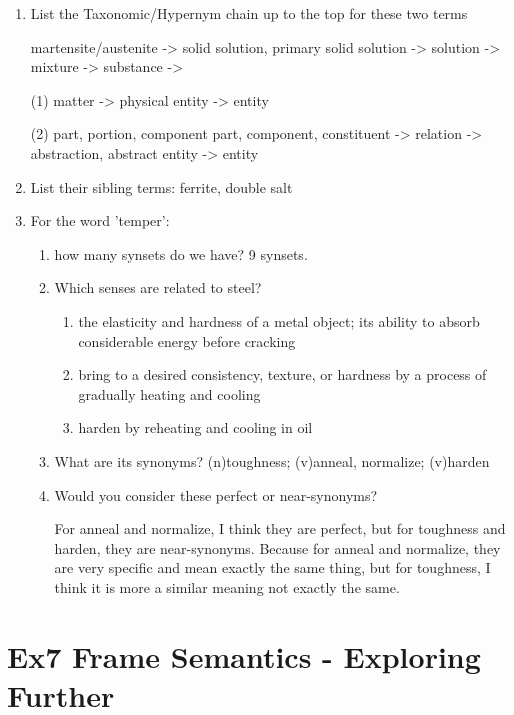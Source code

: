\documentclass[12pt]{article}
\begin{document}
{\begin{enumerate}[1.]
	martensite: a solid solution of carbon in alpha-iron that is formed when steel is cooled so rapidly that 
	the change from austenite to pearlite is suppressed; responsible for the hardness of quenched steel.

	austenite: a solid solution of ferric carbide or carbon in iron; cools to form pearlite or martensite.
	\item List the Taxonomic/Hypernym chain up to the top for these two terms
	
	martensite/austenite -> solid solution, primary solid solution -> solution -> mixture -> substance ->

	(1) matter -> physical entity -> entity

	(2) part, portion, component part, component, constituent -> relation -> abstraction, abstract entity -> entity

	\item List their sibling terms: 
	ferrite, double salt
	\item For the word 'temper': 
	\begin{enumerate}[(1)]
		\item how many synsets do we have? 9 synsets. 
		\item Which senses are related to steel? 
			\begin{enumerate}[*]
				\item the elasticity and hardness of a metal object; 
				its ability to absorb considerable energy before cracking
				\item bring to a desired consistency, texture, or hardness by a process of gradually heating and cooling
				\item harden by reheating and cooling in oil
			\end{enumerate}
		\item What are its synonyms? (n)toughness; (v)anneal, normalize; (v)harden
		\item Would you consider these perfect or near-synonyms? 
		
		For anneal and normalize, I think they are perfect, but for toughness and harden, they are near-synonyms. 
		Because for anneal and normalize, they are very specific and mean exactly the same thing, but for toughness, 
		I think it is more a similar meaning not exactly the same.
	\end{enumerate}
\end{enumerate}
\section{Ex7 Frame Semantics - Exploring Further}
\label{sec: ex7}

}
\end{document}
